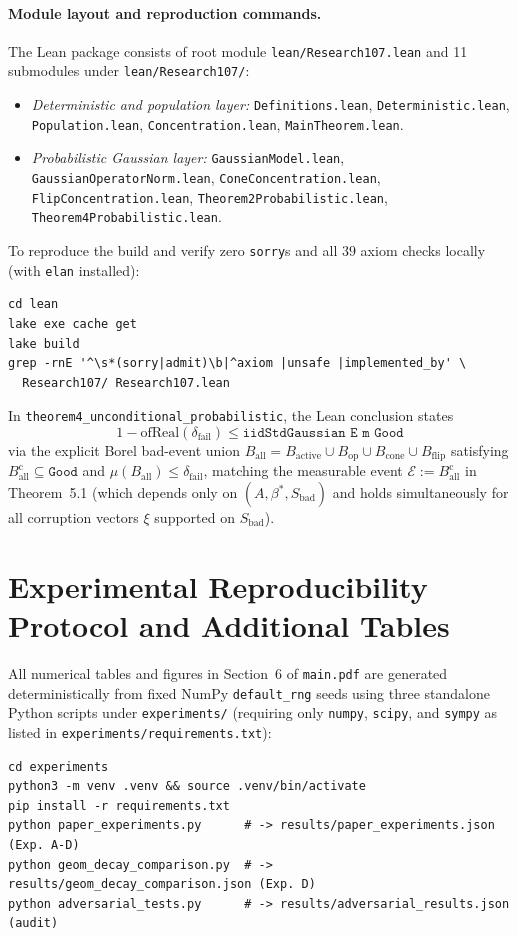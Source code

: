 \documentclass[11pt]{article}
\begin{document}
\paragraph{Module layout and reproduction commands.}
The Lean package consists of root module \texttt{lean/Research107.lean} and 11 submodules under \texttt{lean/Research107/}:
\begin{itemize}\raggedright
  \item \emph{Deterministic and population layer:} \texttt{Definitions.lean}, \texttt{Deterministic.lean}, \texttt{Population.lean}, \texttt{Concentration.lean}, \texttt{MainTheorem.lean}.
  \item \emph{Probabilistic Gaussian layer:} \texttt{GaussianModel.lean}, \texttt{GaussianOperatorNorm.lean}, \texttt{ConeConcentration.lean}, \texttt{FlipConcentration.lean}, \texttt{Theorem2Probabilistic.lean}, \texttt{Theorem4Probabilistic.lean}.
\end{itemize}
To reproduce the build and verify zero \texttt{sorry}s and all $39$ axiom checks locally (with \texttt{elan} installed):
{\small
\begin{verbatim}
cd lean
lake exe cache get
lake build
grep -rnE '^\s*(sorry|admit)\b|^axiom |unsafe |implemented_by' \
  Research107/ Research107.lean
\end{verbatim}
}
In \texttt{theorem4\_unconditional\_probabilistic}, the Lean conclusion states
\[
  1 - \mathrm{ofReal}(\delta_{\mathrm{fail}}) \le \texttt{iidStdGaussian E m Good}
\]
via the explicit Borel bad-event union $B_{\mathrm{all}} = B_{\mathrm{active}} \cup B_{\mathrm{op}} \cup B_{\mathrm{cone}} \cup B_{\mathrm{flip}}$ satisfying $B_{\mathrm{all}}^{\mathrm{c}} \subseteq \texttt{Good}$ and $\mu(B_{\mathrm{all}}) \le \delta_{\mathrm{fail}}$, matching the measurable event $\mathcal{E} := B_{\mathrm{all}}^{\mathrm{c}}$ in Theorem~5.1 (which depends only on $(A, \beta^*, S_{\mathrm{bad}})$ and holds simultaneously for all corruption vectors $\xi$ supported on $S_{\mathrm{bad}}$).

\section{Experimental Reproducibility Protocol and Additional Tables}
\label{sec:sm-exp}

All numerical tables and figures in Section~6 of \texttt{main.pdf} are generated deterministically from fixed NumPy \texttt{default\_rng} seeds using three standalone Python scripts under \texttt{experiments/} (requiring only \texttt{numpy}, \texttt{scipy}, and \texttt{sympy} as listed in \texttt{experiments/requirements.txt}):
{\small
\begin{verbatim}
cd experiments
python3 -m venv .venv && source .venv/bin/activate
pip install -r requirements.txt
python paper_experiments.py      # -> results/paper_experiments.json (Exp. A-D)
python geom_decay_comparison.py  # -> results/geom_decay_comparison.json (Exp. D)
python adversarial_tests.py      # -> results/adversarial_results.json (audit)
\end{verbatim}
}
\end{document}
